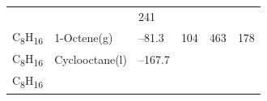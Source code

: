 \documentclass[
  9pt,
]{extbook}
\theoremstyle{definition}
\theoremstyle{definition}
\theoremstyle{definition}
\theoremstyle{remark}
\begin{document}
\begin{longtable}[]{@{}llllll@{}}
\begin{minipage}[t]{0.15\columnwidth}
\strut
\end{minipage} & \begin{minipage}[t]{0.14\columnwidth}\raggedright
\strut
\end{minipage} & \begin{minipage}[t]{0.14\columnwidth}\raggedright
241\strut
\end{minipage}\tabularnewline
\begin{minipage}[t]{0.07\columnwidth}\raggedright
C\textsubscript{8}H\textsubscript{16}\strut
\end{minipage} & \begin{minipage}[t]{0.17\columnwidth}\raggedright
1-Octene(g)\strut
\end{minipage} & \begin{minipage}[t]{0.15\columnwidth}\raggedright
--81.3\strut
\end{minipage} & \begin{minipage}[t]{0.15\columnwidth}\raggedright
104\strut
\end{minipage} & \begin{minipage}[t]{0.14\columnwidth}\raggedright
463\strut
\end{minipage} & \begin{minipage}[t]{0.14\columnwidth}\raggedright
178\strut
\end{minipage}\tabularnewline
\begin{minipage}[t]{0.07\columnwidth}\raggedright
C\textsubscript{8}H\textsubscript{16}\strut
\end{minipage} & \begin{minipage}[t]{0.17\columnwidth}\raggedright
Cyclooctane(l)\strut
\end{minipage} & \begin{minipage}[t]{0.15\columnwidth}\raggedright
--167.7\strut
\end{minipage} & \begin{minipage}[t]{0.15\columnwidth}\raggedright
\strut
\end{minipage} & \begin{minipage}[t]{0.14\columnwidth}\raggedright
\strut
\end{minipage} & \begin{minipage}[t]{0.14\columnwidth}\raggedright
\strut
\end{minipage}\tabularnewline
\begin{minipage}[t]{0.07\columnwidth}\raggedright
C\textsubscript{8}H\textsubscript{16}\strut
\end{minipage} & \begin{minipage}[t]{0.17\columnwidth}\raggedright

\end{minipage}
\end{longtable}
\end{document}
